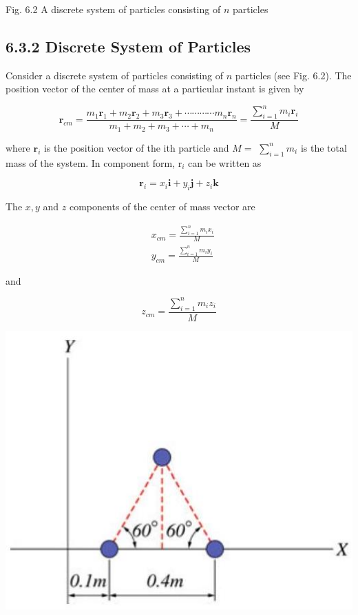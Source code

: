 \documentclass[10pt]{article}
\begin{document}
Fig. 6.2 A discrete system of particles consisting of $n$ particles

\subsection*{6.3.2 Discrete System of Particles}
Consider a discrete system of particles consisting of $n$ particles (see Fig. 6.2). The position vector of the center of mass at a particular instant is given by

$$
\mathbf{r}_{c m}=\frac{m_{1} \mathbf{r}_{1}+m_{2} \mathbf{r}_{2}+m_{3} \mathbf{r}_{3}+\cdots \cdots \cdots \cdots m_{n} \mathbf{r}_{n}}{m_{1}+m_{2}+m_{3}+\cdots+m_{n}}=\frac{\sum_{i=1}^{n} m_{i} \mathbf{r}_{i}}{M}
$$

where $\mathbf{r}_{i}$ is the position vector of the ith particle and $M=$ $\sum_{i=1}^{n} m_{i}$ is the total mass of the system. In component form, $\mathrm{r}_{i}$ can be written as

$$
\mathbf{r}_{i}=x_{i} \mathbf{i}+y_{i} \mathbf{j}+z_{i} \mathbf{k}
$$

The $x, y$ and $z$ components of the center of mass vector are

$$
\begin{aligned}
& x_{c m}=\frac{\sum_{i=1}^{n} m_{i} x_{i}}{M} \\
& y_{c m}=\frac{\sum_{i=1}^{n} m_{i} y_{i}}{M}
\end{aligned}
$$

and

$$
z_{c m}=\frac{\sum_{i=1}^{n} m_{i} z_{i}}{M}
$$

\begin{center}
\includegraphics[max width=\textwidth]{2024_09_13_db1f357d2aad0a03eb2eg-096(1)}
\end{center}
\end{document}
